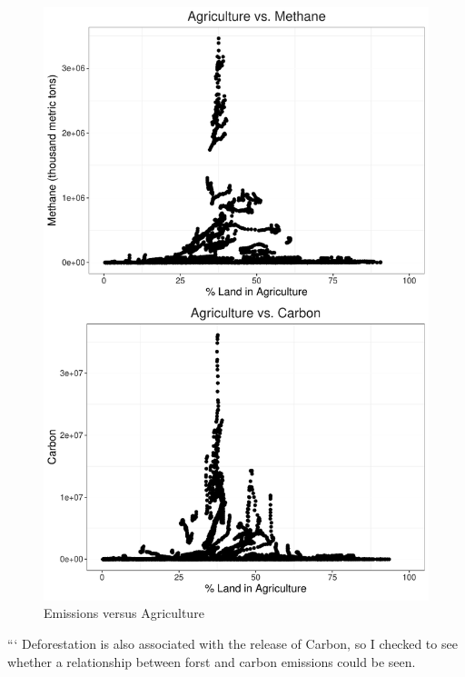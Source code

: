\documentclass[12pt,]{article}
\begin{document}
\begin{figure}
\centering
\includegraphics{Marx_ENV872_Project_files/figure-latex/unnamed-chunk-6-1.pdf}
\caption{\label{fig:fig4}Emissions versus Agriculture}
\end{figure}

``` Deforestation is also associated with the release of Carbon, so I
checked to see whether a relationship between forst and carbon emissions
could be seen.
\end{document}
